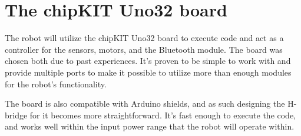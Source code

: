


\section{The chipKIT Uno32 board}
The robot will utilize the chipKIT Uno32 board to execute code and act as a controller for the sensors, motors, and the Bluetooth module. The board
was chosen both due to past experiences. It's proven to be simple to work with and provide multiple ports to make it possible to utilize more than enough modules for the robot's functionality.

The board is also compatible with Arduino shields, and as such designing the H-bridge for it becomes more straightforward. It's fast enough to execute the code, and works well within the input power range that the robot will operate within.

